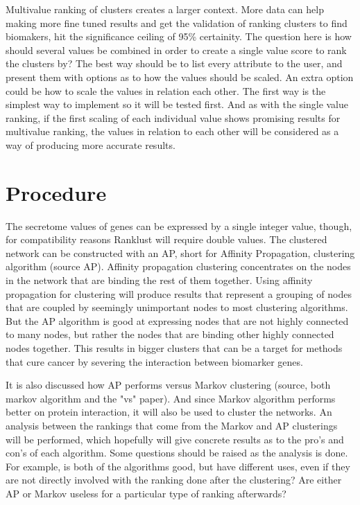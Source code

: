 \documentclass[UKenglish]{ifimaster}
\begin{document}
Multivalue ranking of clusters creates a larger context. More data can help making more fine tuned results and get the
validation of ranking clusters to find biomakers, hit the significance ceiling of 95\% certainity. %
The question here is how should several values be combined in order to create a single value score to rank the clusters
by? The best way should be to list every attribute to the user, and present them with options as to how the values
should be scaled. An extra option could be how to scale the values in relation each other. The first way is the simplest
way to implement so it will be tested first. And as with the single value ranking, if the first scaling of each
individual value shows promising results for multivalue ranking, the values in relation to each other will be
considered as a way of producing more accurate results.


\part{Procedure}
The secretome values of genes can be expressed by a single integer value, though, for compatibility reasons Ranklust
will require double values. The clustered network can be constructed with an AP, short for Affinity Propagation,
clustering algorithm (source AP). Affinity propagation clustering concentrates on the nodes in the network that are
binding the rest of them together. Using affinity propagation for clustering will produce results that represent a
grouping of nodes that are coupled by seemingly unimportant nodes to most clustering algorithms. But the AP algorithm is
good at expressing nodes that are not highly connected to many nodes, but rather the nodes that are binding other highly
connected nodes together. This results in bigger clusters that can be a target for methods that cure cancer by severing
the interaction between biomarker genes.

It is also discussed how AP performs versus Markov clustering (source, both markov algorithm and the "vs" paper). And
since Markov algorithm performs better on protein interaction, it will also be used to cluster the networks. An analysis
between the rankings that come from the Markov and AP clusterings will be performed, which hopefully will give concrete
results as to the pro's and con's of each algorithm. Some questions should be raised as the analysis is done. For
example, is both of the algorithms good, but have different uses, even if they are not directly involved with the
ranking done after the clustering? Are either AP or Markov useless for a particular type of ranking afterwards?
\end{document}
